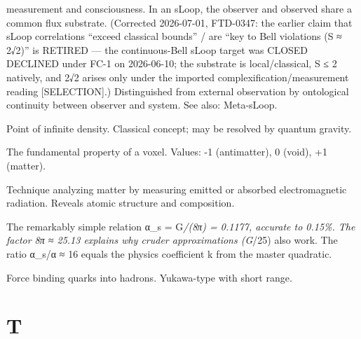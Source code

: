 \documentclass[
  11pt,
  letterpaper,
  twoside,
  openany]{book}
\makeatletter
\let\orig@section\section
\renewcommand{\section}{\needspace{8\baselineskip}\orig@section}
\makeatother
\begin{document}
\begin{description}
measurement and consciousness. In an sLoop, the observer and observed
share a common flux substrate. (Corrected 2026-07-01, FTD-0347: the
earlier claim that sLoop correlations ``exceed classical bounds'' / are
``key to Bell violations (S ≈ 2√2)'' is RETIRED --- the continuous-Bell
sLoop target was CLOSED DECLINED under FC-1 on 2026-06-10; the substrate
is local/classical, S ≤ 2 natively, and 2√2 arises only under the
imported complexification/measurement reading {[}SELECTION{]}.)
Distinguished from external observation by ontological continuity
between observer and system. See also: Meta-sLoop.
\item[\textbf{Singularity}]
Point of infinite density. Classical concept; may be resolved by quantum
gravity.
\item[\textbf{State}]
The fundamental property of a voxel. Values: -1 (antimatter), 0 (void),
+1 (matter).
\item[\textbf{Spectroscopy}]
Technique analyzing matter by measuring emitted or absorbed
electromagnetic radiation. Reveals atomic structure and composition.
\item[**Strong Coupling (G*/π Formula)**]
The remarkably simple relation α\_s = G\emph{/(8π) = 0.1177, accurate to
0.15\%. The factor 8π ≈ 25.13 explains why cruder approximations (G}/25)
also work. The ratio α\_s/α ≈ 16 equals the physics coefficient k from
the master quadratic.
\item[\textbf{Strong Force}]
Force binding quarks into hadrons. Yukawa-type with short range.
\end{description}

\section{T}\label{t}
\end{document}
